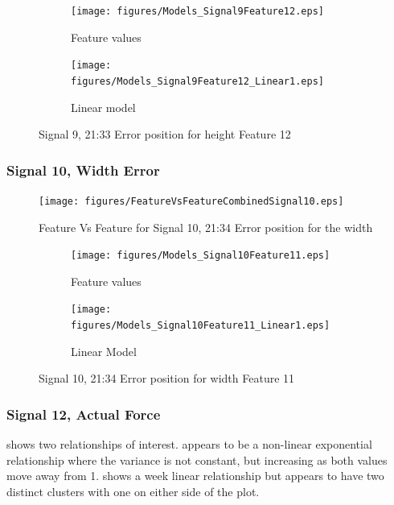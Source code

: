 \documentclass[]{article}
\begin{document}
\begin{figure}[H]
    \centering
		\begin{subfigure}{.5\textwidth}
		  \centering
    			\texttt{[image: figures/Models\_Signal9Feature12.eps]}
		  	\caption{Feature values}
		  	\label{fig:Models_Signal9Feature12}
		\end{subfigure}%
		\begin{subfigure}{.5\textwidth}
		  \centering
 		   	\texttt{[image: figures/Models\_Signal9Feature12\_Linear1.eps]}
		  	\caption{Linear model}
		  	\label{fig:Models_Signal9Feature12_Linear1}
		\end{subfigure}
    \caption{Signal 9, 21:33 Error position for height Feature 12}
    \label{fig:Models_Signal9Feature12_Caption}
\end{figure}





\subsubsection*{Signal 10, Width Error}
\begin{figure}[H]
    \centering
    \texttt{[image: figures/FeatureVsFeatureCombinedSignal10.eps]}
    \caption{Feature Vs Feature for Signal 10, 21:34 Error position for the width}
    \label{fig:FeatureVsFeatureCombinedSignal10}
\end{figure}

\begin{figure}[H]
    \centering
		\begin{subfigure}{.5\textwidth}
		  \centering
    			\texttt{[image: figures/Models\_Signal10Feature11.eps]}
		  	\caption{Feature values}
		  	\label{fig:Models_Signal10Feature7}
		\end{subfigure}%
		\begin{subfigure}{.5\textwidth}
		  \centering
 		   	\texttt{[image: figures/Models\_Signal10Feature11\_Linear1.eps]}
		  	\caption{Linear Model}
		  	\label{fig:Models_Signal10Feature11_Linear1}
		\end{subfigure}
    \caption{Signal 10, 21:34 Error position for width Feature 11}
    \label{fig:Models_Signal10Feature11_Caption}
\end{figure}





\subsubsection*{Signal 12, Actual Force}
 shows two relationships of interest.  appears to be a non-linear exponential relationship where the variance is not constant, but increasing as both values move away from 1.  shows a week linear relationship but appears to have two distinct clusters with one on either side of the plot.
\end{document}
